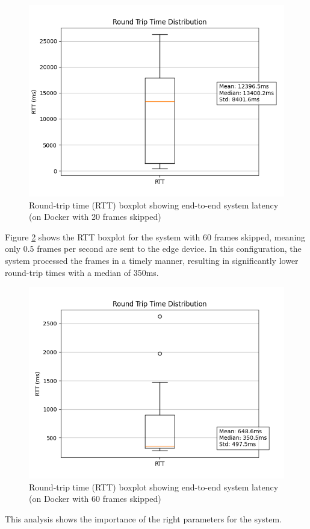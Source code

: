 \documentclass[conference]{IEEEtran}
\begin{document}
\begin{figure}[!h]
    \centering
    \includegraphics[width=1\linewidth]{./res/rtt_distribution-local_docker_test20skip.png}
    \caption{Round-trip time (RTT) boxplot showing end-to-end system latency (on Docker with 20 frames skipped)}
    \label{fig:rtt_distribution_docker20}
\end{figure}

Figure \ref{fig:rtt_distribution_docker60} shows the RTT boxplot for the system with 60 frames skipped, meaning only 0.5 frames per second are sent to the edge device. In this configuration, the system processed the frames in a timely manner, resulting in significantly lower round-trip times with a median of 350ms.

\begin{figure}[!h]
    \centering
    \includegraphics[width=0.8\linewidth]{./res/rtt_distribution-docker_test-60skip.png}
    \caption{Round-trip time (RTT) boxplot showing end-to-end system latency (on Docker with 60 frames skipped)}
    \label{fig:rtt_distribution_docker60}
\end{figure}
This analysis shows the importance of the right parameters for the system. 
\end{document}
